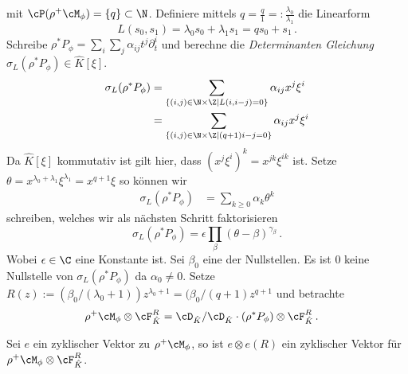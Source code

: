 \begin{comment}
Sei $\rho:t\mapsto x:=-(q+1) t^{q+1}$ so ist
\begin{align*}
\rho^+\cM_\phi &= \rho^+(\cD_{\hat K}/\cD_{\hat K}\cdot P_\phi(x,\partial_x))\\
  &=\cD_{\hat K}/\cD_{\hat K}\cdot(\rho^*P_\phi(x,\partial_x))\\
  &=\cD_{\hat K}/\cD_{\hat K}\cdot(P_\phi(\rho(t),\rho'(t)^{-1}\partial_t))\\
  &=\cD_{\hat K}/\cD_{\hat K}
    \cdot(P_\phi(-(q+1) t^{q+1},-(q+1)^{-1}\frac{1}{(q+1)t^q}\partial_t))\\
  &=\cD_{\hat K}/\cD_{\hat K} \cdot
    ((-(-(q+1) t^{q+1})^2\frac{-(q+1)^{-1}}{(q+1)t^{q}}\partial_t)^{q}
    (-(q+1) t^{q+1}\frac{-(q+1)^{-1}}{(q+1)t^{q}}\partial_t-1)+qa)\\
  &=\cD_{\hat K}/\cD_{\hat K}
    \cdot((-\frac{-(q+1)}{q+1}t^{2(q+1)-q}\partial_t)^{q}
    (\frac{1}{q+1}t\partial_t-1)+qa)\\
  &=\cD_{\hat K}/\cD_{\hat K}
    \cdot((t^{q+2}\partial_t)^{q}
    (\frac{1}{q+1}t\partial_t-1)+qa)
\end{align*}
\end{comment}
mit $\cP(\rho^+\cM_\phi)=\{q\}\subset\N$. Definiere mittels
$q=\frac{q}{1}=:\frac{\lambda_0}{\lambda_1}$ die  Linearform
\[
L(s_0,s_1)=\lambda_0s_0+\lambda_1s_1=qs_0+s_1 \,.
\]
Schreibe $\rho^*P_{\phi}=\sum_i\sum_j\alpha_{ij}t^j\partial_t^i$ und berechne
die \emph{Determinanten Gleichung} $\sigma_L(\rho^*P_{\phi})\in \hat K[\xi]$.
\begin{align*}
\sigma_L(\rho^*P_{\phi})
  &= \sum_{\{(i,j)\in\N\times\Z \mid L(i,i-j)=0\}}\alpha_{ij}x^j\xi^i\\
  &= \sum_{\{(i,j)\in\N\times\Z \mid (q+1)i-j=0\}}\alpha_{ij}x^j\xi^i
\end{align*}
Da $\hat K[\xi]$ kommutativ ist gilt hier, dass $(x^j\xi^i)^k=x^{jk}\xi^{ik}$ ist.
Setze $\theta=x^{\lambda_0+\lambda_1}\xi^{\lambda_1}=x^{q+1}\xi$ so können wir
\begin{align*}
\sigma_L(\rho^*P_{\phi}) &= \sum_{k\geq 0}\alpha_k\theta^k
\end{align*}
schreiben, welches wir als nächsten Schritt faktorisieren
\[
\sigma_L(\rho^*P_\phi)=\epsilon\prod_{\beta}(\theta-\beta)^{\gamma_\beta}\,.
\]
Wobei $\epsilon\in\C$ eine Konstante ist.
Sei $\beta_0$  eine der Nullstellen.
Es ist $0$ keine Nullstelle von $\sigma_L(\rho^*P_\phi)$ da $\alpha_0\neq 0$.
Setze $R(z):=(\beta_0/(\lambda_0+1))z^{\lambda_0+1}=(\beta_0/(q+1)z^{q+1}$ und
betrachte
\begin{align*}
\rho^+\cM_\phi\otimes\cF_{\hat K}^R
  &= \cD_{\hat K}/\cD_{\hat K}\cdot(\rho^*P_{\phi})\otimes\cF_{\hat K}^R \,.
\end{align*}
\begin{lem}
Sei $e$ ein zyklischer Vektor zu $\rho^+\cM_\phi$, so ist $e\otimes e(R)$ ein
zyklischer Vektor für $\rho^+\cM_\phi\otimes\cF_{\hat K}^R$.
\end{lem}

